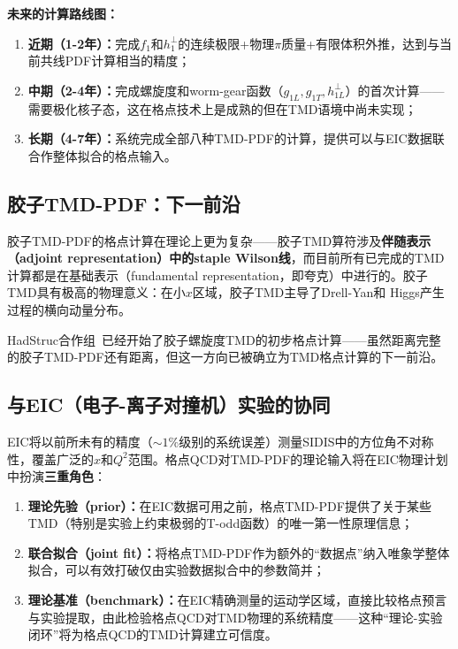 \documentclass[12pt,a4paper]{ctexart}
\theoremstyle{definition}
\begin{document}
\textbf{未来的计算路线图：}
\begin{enumerate}
    \item \textbf{近期（1-2年）：}完成$f_1$和$h_1^\perp$的连续极限+物理$\pi$质量+有限体积外推，达到与当前共线PDF计算相当的精度；
    \item \textbf{中期（2-4年）：}完成螺旋度和worm-gear函数（$g_{1L}, g_{1T}, h_{1L}^\perp$）的首次计算——需要极化核子态，这在格点技术上是成熟的但在TMD语境中尚未实现；
    \item \textbf{长期（4-7年）：}系统完成全部八种TMD-PDF的计算，提供可以与EIC数据联合作整体拟合的格点输入。
\end{enumerate}

\subsection{胶子TMD-PDF：下一前沿}

胶子TMD-PDF的格点计算在理论上更为复杂——胶子TMD算符涉及\textbf{伴随表示（adjoint representation）中的staple Wilson线}，而目前所有已完成的TMD计算都是在基础表示（fundamental representation，即夸克）中进行的。胶子TMD具有极高的物理意义：在小$x$区域，胶子TMD主导了Drell-Yan和 Higgs产生过程的横向动量分布。

HadStruc合作组~\cite{Egerer2022}已经开始了胶子螺旋度TMD的初步格点计算——虽然距离完整的胶子TMD-PDF还有距离，但这一方向已被确立为TMD格点计算的下一前沿。

\subsection{与EIC（电子-离子对撞机）实验的协同}

EIC将以前所未有的精度（$\sim 1\%$级别的系统误差）测量SIDIS中的方位角不对称性，覆盖广泛的$x$和$Q^2$范围。格点QCD对TMD-PDF的理论输入将在EIC物理计划中扮演\textbf{三重角色}：
\begin{enumerate}
    \item \textbf{理论先验（prior）：}在EIC数据可用之前，格点TMD-PDF提供了关于某些TMD（特别是实验上约束极弱的T-odd函数）的唯一第一性原理信息；
    \item \textbf{联合拟合（joint fit）：}将格点TMD-PDF作为额外的``数据点''纳入唯象学整体拟合，可以有效打破仅由实验数据拟合中的参数简并；
    \item \textbf{理论基准（benchmark）：}在EIC精确测量的运动学区域，直接比较格点预言与实验提取，由此检验格点QCD对TMD物理的系统精度——这种``理论-实验闭环''将为格点QCD的TMD计算建立可信度。
\end{enumerate}
\end{document}
